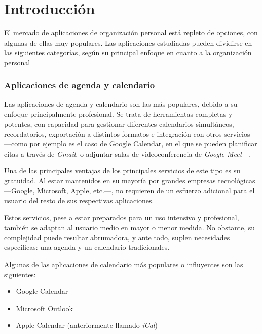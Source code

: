 \documentclass[10pt, a4paper]{aqademic}
\begin{document}
\newpage


\chapter{Introducción}

El mercado de aplicaciones de organización personal está repleto de opciones, con algunas de ellas muy populares. Las aplicaciones estudiadas pueden dividirse en las siguientes categorías, según su principal enfoque en cuanto a la organización personal

\subsection*{Aplicaciones de agenda y calendario}

Las aplicaciones de agenda y calendario son las más populares, debido a su enfoque principalmente profesional. Se trata de herramientas completas y potentes, con capacidad para gestionar diferentes calendarios simultáneos, recordatorios, exportación a distintos formatos e integración con otros servicios ---como por ejemplo es el caso de Google Calendar, en el que se pueden planificar citas a través de \textit{Gmail}, o adjuntar salas de videoconferencia de \textit{Google Meet}---. 

\medskip

Una de las principales ventajas de los principales servicios de este tipo es su gratuidad. Al estar mantenidos en su mayoría por grandes empresas tecnológicas ---Google, Microsoft, Apple, etc.---, no requieren de un esfuerzo adicional para el usuario del resto de sus respectivas aplicaciones.

\medskip

Estos servicios, pese a estar preparados para un uso intensivo y profesional, también se adaptan al usuario medio en mayor o menor medida. No obstante, su complejidad puede resultar abrumadora, y ante todo, suplen necesidades específicas: una agenda y un calendario tradicionales.

\medskip

Algunas de las aplicaciones de calendario más populares o influyentes son las siguientes:

\begin{itemize}
	\item Google Calendar
	\item Microsoft Outlook
	\item Apple Calendar (anteriormente llamado \textit{iCal})
\end{itemize}
\end{document}
